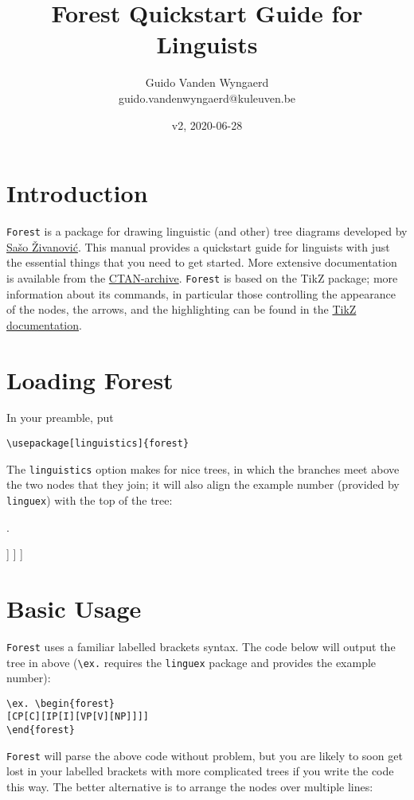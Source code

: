 \documentclass[english,12pt]{article}
\title{Forest Quickstart Guide for Linguists}
\author{Guido Vanden Wyngaerd\\
guido.vandenwyngaerd@kuleuven.be}
\date{v2,  2020-06-28}
\begin{document}
\maketitle

\tableofcontents

\section{Introduction}

\texttt{Forest} is a package for drawing linguistic (and other) tree diagrams developed by \href{http://spj.ff.uni-lj.si/zivanovic/}{Sašo Živanović}. This manual provides a quickstart guide for linguists with just the essential things that you need to get started. More extensive documentation is available from the \href{https://www.ctan.org/pkg/forest}{CTAN-archive}. \texttt{Forest} is based on the TikZ package; more information about its commands, in particular those controlling the appearance of the nodes, the arrows, and the highlighting can be found in the \href{https://sourceforge.net/projects/pgf/}{TikZ documentation}.

\section{Loading Forest}

In your preamble, put \begin{verbatim}
\usepackage[linguistics]{forest}\end{verbatim}
The \texttt{linguistics} option makes for nice trees, in which the branches meet above the two nodes that they join; it will also align the example number (provided by \texttt{linguex}) with the top of the tree:

\ex.\label{1}
\begin{forest}
[CP [C] 
	[IP [I] 
		[VP [V]
			[NP]  
		] 
	] 
]
\end{forest}


\section{Basic Usage}

\texttt{Forest} uses a familiar labelled brackets syntax. The code below will output the tree in \Last above (\verb|\ex.| requires the \texttt{linguex} package and provides the example number):

\begin{lstlisting}[basicstyle=\ttfamily,basewidth=0.5em]
\ex. \begin{forest}
[CP[C][IP[I][VP[V][NP]]]]
\end{forest}
\end{lstlisting}
\texttt{Forest} will parse the above code without problem, but you are likely to soon get lost in your labelled brackets with more complicated trees if you write the code this way. The better alternative is to arrange the nodes over multiple lines:
\end{document}
